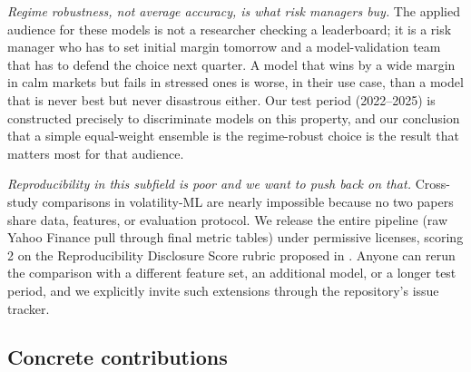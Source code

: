 \textit{Regime robustness, not average accuracy, is what risk managers buy.} The applied audience for these models is not a researcher checking a leaderboard; it is a risk manager who has to set initial margin tomorrow and a model-validation team that has to defend the choice next quarter. A model that wins by a wide margin in calm markets but fails in stressed ones is worse, in their use case, than a model that is never best but never disastrous either. Our test period (2022--2025) is constructed precisely to discriminate models on this property, and our conclusion that a simple equal-weight ensemble is the regime-robust choice is the result that matters most for that audience.

\textit{Reproducibility in this subfield is poor and we want to push back on that.} Cross-study comparisons in volatility-ML are nearly impossible because no two papers share data, features, or evaluation protocol. We release the entire pipeline (raw Yahoo Finance pull through final metric tables) under permissive licenses, scoring 2 on the Reproducibility Disclosure Score rubric proposed in \citet{Khan2026}. Anyone can rerun the comparison with a different feature set, an additional model, or a longer test period, and we explicitly invite such extensions through the repository's issue tracker.

\subsection*{Concrete contributions}

